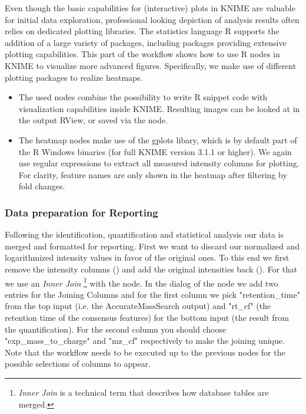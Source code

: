 Even though the basic capabilities for (interactive) plots in KNIME are valuable for initial data exploration, professional looking depiction of analysis results often relies on dedicated plotting libraries. The statistics language R supports the addition of a large variety of packages, including packages providing extensive plotting capabilities. This part of the workflow shows how to use R nodes in KNIME to visualize more advanced figures. Specifically, we make use of different plotting packages to realize heatmaps.


\begin{itemize}
\item The used  nodes combine the possibility to write R snippet code with visualization capabilities inside KNIME. Resulting images can be looked at in the output RView, or saved via the  node.
\item The heatmap nodes make use of the gplots libary, which is by default part of the R Windows binaries (for full KNIME version 3.1.1 or higher). We again use regular expressions to extract all measured intensity columns for plotting. For clarity, feature names are only shown in the heatmap after filtering by fold changes.
\end{itemize}

\subsubsection{Data preparation for Reporting}
Following the identification, quantification and statistical analysis our data is merged and formatted for reporting.
First we want to discard our normalized and logarithmized intensity values in favor of the original ones.
To this end we first remove the intensity columns () and add the original intensities back ().
For that we use an \textit{Inner Join} \footnote{\textit{Inner Join} is a technical term that describes how database tables are merged.} with the  node. In the dialog of the node we add two entries for the Joining Columns and for the first column we pick "retention\_time" from the top input (i.e. the AccurateMassSearch output) and "rt\_cf" (the retention time of the consensus features) for the bottom input (the result from the quantification). For the second column you should choose "exp\_mass\_to\_charge" and "mz\_cf" respectively to make the joining unique. Note that the workflow needs to be executed up to the previous nodes for the possible selections of columns to appear.

